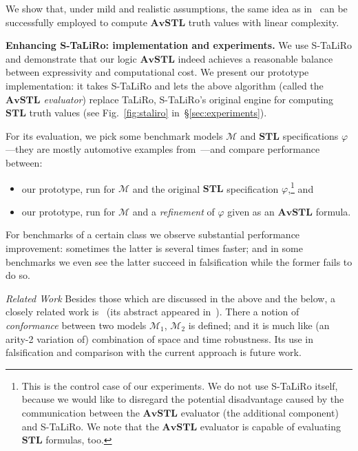 \documentclass[envcountsect,orivec]{llncs} \usepackage{etex} \usepackage[]{graphicx}
\newcommand{\STL}{\textbf{STL}}
\newcommand{\AvSTL}{\textbf{AvSTL}}
\begin{document}
We show that, under mild and realistic
assumptions, the same idea as in~\cite{DBLP:conf/cav/DonzeFM13} can be successfully
employed
to compute $\AvSTL$ truth values with linear complexity.





\textbf{Enhancing S-TaLiRo: implementation and experiments.} 
We use S-TaLiRo and demonstrate that our logic $\AvSTL$ indeed achieves a reasonable balance
between expressivity and computational cost.  We present our
prototype implementation: it takes S-TaLiRo and lets the above algorithm
(called the \emph{$\AvSTL$ evaluator})  replace TaLiRo,
S-TaLiRo's
original engine for computing $\STL$ truth values  (see
Fig.~\ref{fig:staliro} in~\S{}\ref{sec:experiments}).

For its evaluation, 
we pick some 
benchmark models $\mathcal{M}$ and $\STL$ specifications $\varphi$---they are mostly automotive
examples from~\cite{HoxhaAF14arch1}---and compare performance between:
\begin{itemize}
\item our prototype, run for $\mathcal{M}$ and the original
  $\STL$ specification $\varphi$,\footnote{
    This is the control case of our experiments.  
    We do not use S-TaLiRo itself, because we would like to disregard
    the potential disadvantage caused by the communication between the
    $\AvSTL$ evaluator (the additional component) and S-TaLiRo. 
    We note that the $\AvSTL$ evaluator is capable of
    evaluating $\STL$ formulas, too.} and
\item our prototype, run for $\mathcal{M}$ and a
  \emph{refinement} of $\varphi$ given as an  $\AvSTL$ formula.
\end{itemize}
For benchmarks of a certain class we observe substantial performance
improvement:  sometimes the latter is several times faster; and in some
benchmarks we even see the latter succeed in falsification while the former 
fails to do so.

\noindent
\textit{Related Work}\;
Besides those which are discussed in the above
and the below, a closely related work
is~\cite{DBLP:journals/corr/AbbasHFDKU14} (its abstract appeared
in~\cite{DBLP:conf/iccps/AbbasHFDKU14}). There a notion of
\emph{conformance} between two models $\mathcal{M}_{1}$,
$\mathcal{M}_{2}$ is defined; and it is much like (an arity-2 variation
of) combination of  space and time
robustness. Its use in falsification and comparison with the current
approach is future work.
\end{document}

